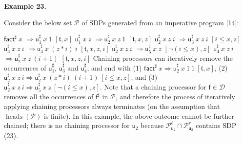 \documentclass[10pt,a4paper]{amsart}
\begin{document}
 
 
 
\par\medskip\noindent\textbf{Example 23.}\par
 
 
Consider the below set $\mathcal{P}$ of SDPs generated from an imperative program [14]:\par
    $\displaystyle{\mathsf{fact}^{\sharp}}\ {x}$ $\displaystyle\Rightarrow{{\mathsf{u}_{1}^{\sharp}}\ {x}}\ {1}$ $\displaystyle[\mathfrak{t},x]$ $\displaystyle{{\mathsf{u}_{1}^{\sharp}}\ {x}}\ {z}$ $\displaystyle\Rightarrow{{{\mathsf{u}_{2}^{\sharp}}\ {x}}\ {z}}\ {1}$ $\displaystyle[\mathfrak{t},x,z]$     $\displaystyle{{{\mathsf{u}_{2}^{\sharp}}\ {x}}\ {z}}\ {i}$ $\displaystyle\Rightarrow{{{\mathsf{u}_{3}^{\sharp}}\ {x}}\ {z}}\ {i}$ $\displaystyle[i\leq x,z]$ $\displaystyle{{{\mathsf{u}_{3}^{\sharp}}\ {x}}\ {z}}\ {i}$ $\displaystyle\Rightarrow{{{\mathsf{u}_{4}^{\sharp}}\ {x}}\ {(z*i)}}\ {i}$ $\displaystyle[\mathfrak{t},x,z,i]$     $\displaystyle{{{\mathsf{u}_{2}^{\sharp}}\ {x}}\ {z}}\ {i}$ $\displaystyle\Rightarrow{{\mathsf{u}_{5}^{\sharp}}\ {x}}\ {z}$ $\displaystyle[\neg(i\leq x),z]$ $\displaystyle{{{\mathsf{u}_{4}^{\sharp}}\ {x}}\ {z}}\ {i}$ $\displaystyle\Rightarrow{{{\mathsf{u}_{2}^{\sharp}}\ {x}}\ {z}}\ {(i+1)}$ $\displaystyle[\mathfrak{t},x,z,i]$    
Chaining processors can iteratively remove the occurrences of $\mathsf{u}_{1}^{\sharp}$, $\mathsf{u}_{3}^{\sharp}$ and $\mathsf{u}_{4}^{\sharp}$, and end with (1) ${{\mathsf{fact}^{\sharp}}\ {x}}\Rightarrow{{{{\mathsf{u}_{2}^{\sharp}}\ {x}}\ {1}}\ {1}}\ [\mathfrak{t},x]$, (2) ${{{{\mathsf{u}_{2}^{\sharp}}\ {x}}\ {z}}\ {i}}\Rightarrow{{{{\mathsf{u}_{2}^{\sharp}}\ {x}}\ {(z*i)}}\ {(i+1)}}\ [i\leq x,z]$, and (3) ${{{{\mathsf{u}_{2}^{\sharp}}\ {x}}\ {z}}\ {i}}\Rightarrow{{{\mathsf{u}_{5}^{\sharp}}\ {x}}\ {z}}\ [\neg(i\leq x),z]$. Note that a chaining processor for $\mathsf{f}\in\mathcal{D}$ removes all the occurrences of $\mathsf{f}^{\sharp}$ in $\mathcal{P}$, and therefore the process of iteratively applying chaining processors always terminates (on the assumption that $\operatorname{heads}(\mathcal{P})$ is finite). In this example, the above outcome cannot be further chained; there is no chaining processor for $\mathsf{u}_{2}$ because $\mathcal{P}_{\mathsf{u}_{2}}^{\ell}\cap\mathcal{P}_{\mathsf{u}_{2}}^{r}$ contains SDP (23).\par
 
\end{document}
